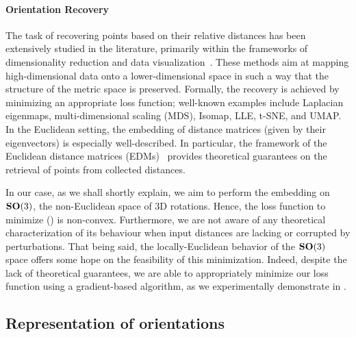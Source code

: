 \paragraph{Orientation Recovery}
The task of recovering points based on their relative distances has been extensively studied in the literature, primarily within the frameworks of dimensionality reduction and data visualization~\cite{belkin2003laplacian,kruskal1978multidimensional, maaten2008visualizing, mcinnes2018umap,dokmanic2015euclidean}. 
These methods aim at mapping high-dimensional data onto a lower-dimensional space in such a way that the structure of the metric space is preserved. 
Formally, the recovery is achieved by minimizing an appropriate loss function; well-known examples include Laplacian eigenmaps, multi-dimensional scaling (MDS), Isomap, LLE, t-SNE, and UMAP. 
In the Euclidean setting, the embedding of distance matrices (given by their eigenvectors) is especially well-described.
In particular, the framework of the Euclidean distance matrices (EDMs)~\cite{dokmanic2015euclidean} provides theoretical guarantees on the retrieval of points from collected distances.

In our case, as we shall shortly explain, we aim to perform the embedding on $\mathrm{\mathbf{SO}}(3)$, the non-Euclidean space of 3D rotations. Hence, the loss function to minimize () is non-convex. Furthermore, we are not aware of any theoretical characterization of its behaviour when input distances are lacking or corrupted by perturbations. That being said, the locally-Euclidean behavior of the $\mathrm{\mathbf{SO}}(3)$ space offers some hope on the feasibility of this minimization. 
Indeed, despite the lack of theoretical guarantees, we are able to appropriately minimize our loss function using a gradient-based algorithm, as we experimentally demonstrate in .


\subsection{Representation of orientations}\label{sec:method:orientation-representation}

